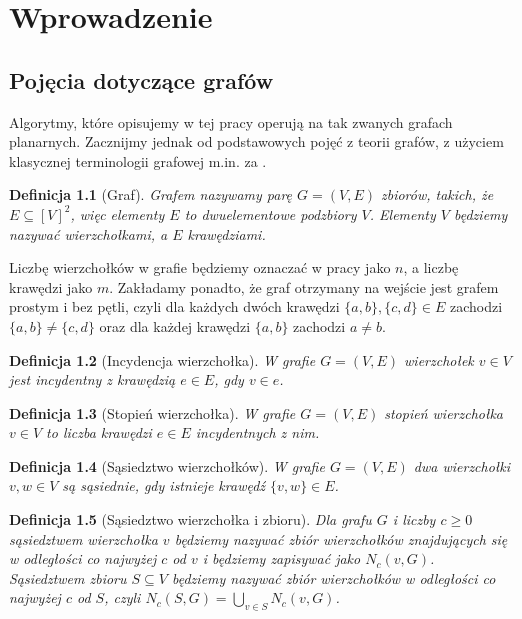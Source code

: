 \documentclass[twoside,a4paper,12pt]{report} %
\theoremstyle{break}
\newtheorem{definition}{Definicja}[section]
\begin{document}
\thispagestyle{empty} 
\newpage
\thispagestyle{empty} 

\thispagestyle{empty} 
\tableofcontents %


\chapter{Wprowadzenie}

\section{Pojęcia dotyczące grafów} \label{rozdzial_1}
Algorytmy, które opisujemy w tej pracy operują na tak zwanych grafach planarnych. Zacznijmy jednak od podstawowych pojęć z teorii grafów, z użyciem klasycznej terminologii grafowej m.in. za \cite{diestel}.

\begin{definition}[Graf]
\emph{Grafem} nazywamy parę $G=(V,E)$ zbiorów, takich, że $E \subseteq [V]^2$, więc elementy $E$ to dwuelementowe podzbiory $V$. Elementy $V$ będziemy nazywać wierzchołkami, a $E$ krawędziami.
\end{definition}

Liczbę wierzchołków w grafie będziemy oznaczać w pracy jako $n$, a liczbę krawędzi jako $m$.
Zakładamy ponadto, że graf otrzymany na wejście jest grafem prostym i bez pętli, czyli dla każdych dwóch krawędzi $\{a,b\},\{c,d\}\in E$ zachodzi $\{a,b\}\neq \{c,d\}$ oraz dla każdej krawędzi $\{a,b\}$ zachodzi $a\neq b$.

\begin{definition}[Incydencja wierzchołka]
W grafie $G=(V,E)$ wierzchołek $v \in V$ jest \emph{incydentny} z krawędzią $e \in E$, gdy $v \in e$.
\end{definition}

\begin{definition}[Stopień wierzchołka]
W grafie $G=(V,E)$ \emph{stopień wierzchołka} $v \in V$ to liczba krawędzi $e \in E$ incydentnych z nim. 
\end{definition}

\begin{definition}[Sąsiedztwo wierzchołków]
W grafie $G=(V,E)$ dwa wierzchołki $v,w \in V$ są \emph{sąsiednie}, gdy istnieje krawędź $\{v, w\} \in E$.
\end{definition}

\begin{definition}[Sąsiedztwo wierzchołka i zbioru]
Dla grafu $G$ i liczby $c \ge 0$ \emph{sąsiedztwem wierzchołka} $v$ będziemy nazywać zbiór wierzchołków znajdujących się w odległości co najwyżej $c$ od $v$ i będziemy zapisywać jako $N_c(v,G)$. \emph{Sąsiedztwem zbioru} $S \subseteq V$ będziemy nazywać zbiór wierzchołków w odległości co najwyżej $c$ od $S$, czyli $N_c(S,G)=\bigcup_{v \in S}N_c(v,G)$.
\end{definition}
\end{document}
